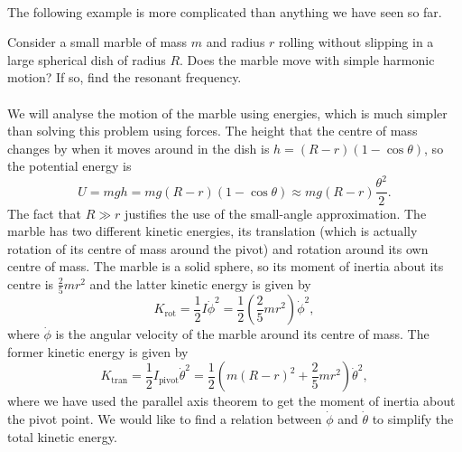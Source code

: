 \documentclass[../classical_mechanics.tex]{subfiles}
\begin{document}
        \paragraph{}
        The following example is more complicated than anything we have seen so far.
        \begin{example}
            Consider a small marble of mass $m$ and radius $r$ rolling without slipping in a large spherical dish of radius $R$.
            Does the marble move with simple harmonic motion?
            If so, find the resonant frequency.

            \paragraph{}
            We will analyse the motion of the marble using energies, which is much simpler than solving this problem using forces.
            The height that the centre of mass changes by when it moves around in the dish is $h=(R-r)(1-\cos\theta)$, so the potential energy is
            \begin{equation}
                U=mgh=mg(R-r)(1-\cos\theta)\approx mg(R-r)\frac{\theta^2}{2}.
            \end{equation}
            The fact that $R\gg r$ justifies the use of the small-angle approximation.
            The marble has two different kinetic energies, its translation (which is actually rotation of its centre of mass around the pivot) and rotation around its own centre of mass.
            The marble is a solid sphere, so its moment of inertia about its centre is $\frac{2}{5}mr^2$ and the latter kinetic energy is given by
            \begin{equation}
                K_\text{rot}=\frac{1}{2}I\dot{\phi}^2=\frac{1}{2}\left(\frac{2}{5}mr^2\right)\dot{\phi}^2,
            \end{equation}
            where $\dot{\phi}$ is the angular velocity of the marble around its centre of mass.
            The former kinetic energy is given by
            \begin{equation}
                K_\text{tran}=\frac{1}{2}I_\text{pivot}\dot{\theta}^2=\frac{1}{2}\left(m(R-r)^2+\frac{2}{5}mr^2\right)\dot{\theta}^2,
            \end{equation}
            where we have used the parallel axis theorem to get the moment of inertia about the pivot point.
            We would like to find a relation between $\dot{\phi}$ and $\dot{\theta}$ to simplify the total kinetic energy.

\end{example}
\end{document}
